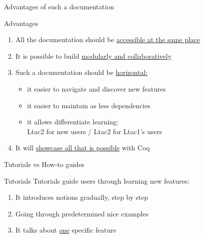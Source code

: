 \documentclass[10pt]{beamer}
\begin{document}
\begin{frame}{Advantages of such a documentation}
  \begin{tcbProp}{Advantages}
    \begin{enumerate}
      \item<1-> All the documentation should be \ul{accessible at the same place}
      \item<2-> It is possible to build \ul{modularly and collaboratively}
      \item<3-> Such a documentation should be \ul{horizontal:}
      \begin{itemize}[label=$-$]
        \item it easier to navigate and discover new features
        \item it easier to maintain as less dependencies
        \item it allows differentiate learning: \\
              Ltac2 for new users\;  /  \;Ltac2 for Ltac1's users
      \end{itemize}
      \item<4-> It will \ul{showcase all that is possible} with Coq
    \end{enumerate}
  \end{tcbProp}
\end{frame}

\begin{frame}{Tutorials vs How-to guides}
  \begin{tcbProp}{Tutorials}
    Tutorials guide users through learning new features:
    \begin{enumerate}
      \item It introduces notions gradually, step by step
      \item Going through predetermined nice examples
      \item It talks about \ul{one} specific feature
    \end{enumerate}
\end{tcbProp}
\end{frame}
\end{document}
